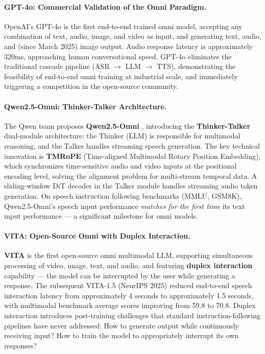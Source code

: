 \paragraph{GPT-4o: Commercial Validation of the Omni Paradigm.}
OpenAI's GPT-4o \cite{openai2024gpt4o} is the first end-to-end trained omni model,
accepting any combination of text, audio, image, and video as input,
and generating text, audio, and (since March 2025) image output.
Audio response latency is approximately 320ms, approaching human conversational speed.
GPT-4o eliminates the traditional cascade pipeline (ASR $\rightarrow$ LLM $\rightarrow$ TTS),
demonstrating the feasibility of end-to-end omni training at industrial scale,
and immediately triggering a competition in the open-source community.

\paragraph{Qwen2.5-Omni: Thinker-Talker Architecture.}
The Qwen team proposes \textbf{Qwen2.5-Omni} \cite{xu2025qwen25omni},
introducing the \textbf{Thinker-Talker} dual-module architecture:
the Thinker (LLM) is responsible for multimodal reasoning, and the Talker handles streaming speech generation.
The key technical innovation is \textbf{TMRoPE} (Time-aligned Multimodal Rotary Position Embedding),
which synchronizes time-sensitive audio and video inputs at the positional encoding level,
solving the alignment problem for multi-stream temporal data.
A sliding-window DiT decoder in the Talker module handles streaming audio token generation.
On speech instruction following benchmarks (MMLU, GSM8K),
Qwen2.5-Omni's speech input performance \textit{matches for the first time} its text input performance ---
a significant milestone for omni models.

\paragraph{VITA: Open-Source Omni with Duplex Interaction.}
\textbf{VITA} \cite{fu2024vita} is the first open-source omni multimodal LLM,
supporting simultaneous processing of video, image, text, and audio,
and featuring \textbf{duplex interaction} capability --- the model can be interrupted by the user while generating a response.
The subsequent VITA-1.5 (NeurIPS 2025) reduced end-to-end speech interaction latency
from approximately 4 seconds to approximately 1.5 seconds, with multimodal benchmark average scores improving from 59.8 to 70.8.
Duplex interaction introduces post-training challenges that standard instruction-following pipelines
have never addressed:
How to generate output while continuously receiving input?
How to train the model to appropriately interrupt its own responses?

